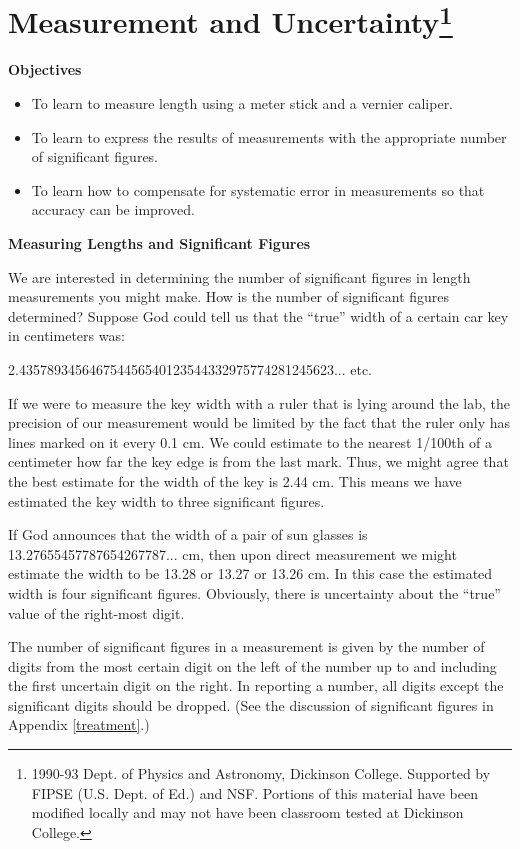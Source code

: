
\section{Measurement and Uncertainty\footnote{
1990-93 Dept. of Physics and Astronomy, Dickinson College. Supported by FIPSE
(U.S. Dept. of Ed.) and NSF. Portions of this material have been modified locally
and may not have been classroom tested at Dickinson College.
}}

\makelabheader %

\textbf{Objectives} 

\begin{itemize}
\item To learn to measure length using a meter stick and a vernier caliper. 
\item To learn to express the results of measurements with the appropriate number
of significant figures. 
\item To learn how to compensate for systematic error in measurements so that accuracy
can be improved.
\end{itemize}
\textbf{Measuring Lengths and Significant Figures} 

We are interested in determining the number of significant figures in length
measurements you might make. How is the number of significant figures determined?
Suppose God could tell us that the ``true'' width of a certain
car key in centimeters was:

2.435789345646754456540123544332975774281245623... etc. 

If we were to measure the key width with a ruler that is lying around the lab,
the precision of our measurement would be limited by the fact that the ruler
only has lines marked on it every 0.1 cm. We could estimate to the nearest 1/100th
of a centimeter how far the key edge is from the last mark. Thus, we might agree
that the best estimate for the width of the key is 2.44 cm. This means we have
estimated the key width to three significant figures. 

If God announces that the width of a pair of sun glasses is 13.27655457787654267787...
cm, then upon direct measurement we might estimate the width to be 13.28 or
13.27 or 13.26 cm. In this case the estimated width is four significant figures.
Obviously, there is uncertainty about the ``true'' value of
the right-most digit.

The number of significant figures in a measurement is given by the number of
digits from the most certain digit on the left of the number up to and including
the first uncertain digit on the right. In reporting a number, all digits except
the significant digits should be dropped. (See the discussion of significant
figures in Appendix \ref{treatment}.)

